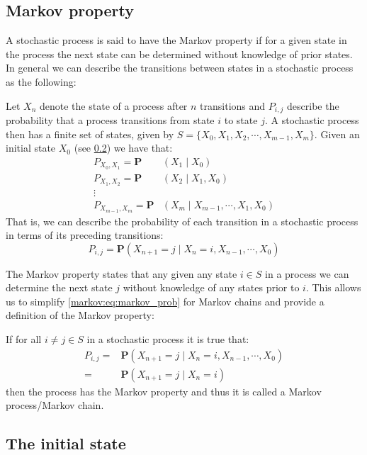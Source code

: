 \subsection{Markov property}\label{markov:property}
A stochastic process is said to have the Markov property if for a given state in the process the next state can be determined without knowledge of prior states.
In general we can describe the transitions between states in a stochastic process as the following:

Let $X_n$ denote the state of a process after $n$ transitions and $P_{i,j}$ describe the probability that a process transitions from state $i$ to state $j$.
A stochastic process then has a finite set of states, given by $S = \{X_0, X_1, X_2,\cdots, X_{m-1}, X_m\}$.
Given an initial state $X_0$ (see \cref{markov:initialstate}) we have that:
\begin{align*}
P_{X_0,X_1} = \mathbf{P}&(X_1 \mid X_0)\\
P_{X_1,X_2} = \mathbf{P}&(X_2 \mid X_1, X_0)\\
\vdots\\
P_{X_{m-1},X_m} = \mathbf{P}&(X_m \mid X_{m-1}, \cdots, X_1, X_0)
\end{align*}
That is, we can describe the probability of each transition in a stochastic process in terms of its preceding transitions:
\begin{equation}\label{markov:eq:stochastic_prob}
P_{i,j} = \mathbf{P}(X_{n+1} = j \mid X_n = i, X_{n-1}, \cdots, X_0)
\end{equation}

The Markov property states that any given any state $i \in S$ in a process we can determine the next state $j$ without knowledge of any states prior to $i$.
This allows us to simplify \cref{markov:eq:markov_prob} for Markov chains and provide a definition of the Markov property:

If for all $i \neq j \in S$ in a stochastic process it is true that:
\begin{align}\label{markov:eq:markov_prob}
P_{i,j} = &\mathbf{P}(X_{n+1} = j \mid X_n = i, X_{n-1}, \cdots, X_0) \nonumber\\
        = &\mathbf{P}(X_{n+1} = j \mid X_n = i)
\end{align}
then the process has the Markov property and thus it is called a Markov process/Markov chain.

\subsection{The initial state}\label{markov:initialstate}
